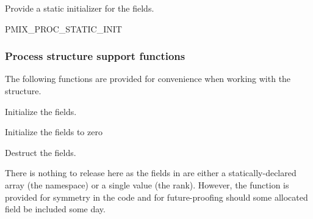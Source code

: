 
Provide a static initializer for the  fields.

\cspecificstart
\begin{codepar}
PMIX_PROC_STATIC_INIT
\end{codepar}
\cspecificend

\subsubsection{Process structure support functions}

The following functions are provided for convenience when working with the  structure.


Initialize the  fields.


\begin{arglist}
\end{arglist}

\descr

Initialize the fields to zero


Destruct the  fields.


\begin{arglist}
\end{arglist}

There is nothing to release here as the fields in  are either a statically-declared array (the namespace) or a single value (the rank). However, the function is provided for symmetry in the code and for future-proofing should some allocated field be included some day.

